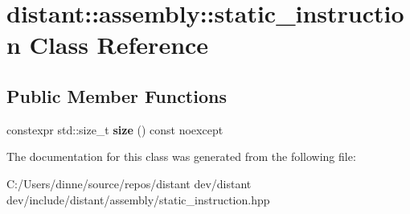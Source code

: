\hypertarget{classdistant_1_1assembly_1_1static__instruction}{}\section{distant\+:\+:assembly\+:\+:static\+\_\+instruction Class Reference}
\label{classdistant_1_1assembly_1_1static__instruction}
\subsection*{Public Member Functions}
\begin{DoxyCompactItemize}
\item 
\mbox{\label{classdistant_1_1assembly_1_1static__instruction_a66479e12ac3dcceeb3fb1460a96e9c70}} 
constexpr std\+::size\+\_\+t {\bfseries size} () const noexcept
\end{DoxyCompactItemize}


The documentation for this class was generated from the following file\+:\begin{DoxyCompactItemize}
\item 
C\+:/\+Users/dinne/source/repos/distant dev/distant dev/include/distant/assembly/static\+\_\+instruction.\+hpp\end{DoxyCompactItemize}
